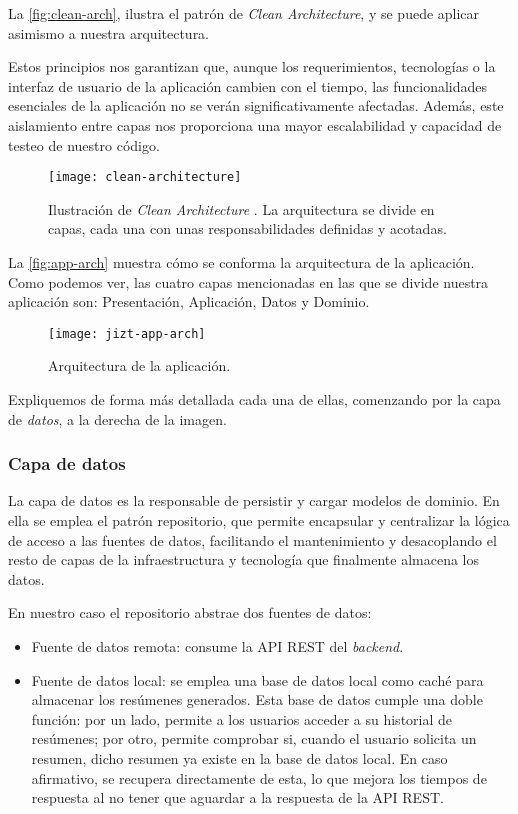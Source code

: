 La \autoref{fig:clean-arch}, ilustra el patrón de \emph{Clean Architecture}, y se puede aplicar asimismo a nuestra arquitectura.

Estos principios nos garantizan que, aunque los requerimientos, tecnologías o la interfaz de usuario de la aplicación cambien con el tiempo, las funcionalidades esenciales de la aplicación no se verán significativamente afectadas. Además, este aislamiento entre capas nos proporciona una mayor escalabilidad y capacidad de testeo de nuestro código.

\begin{figure}[!h]
	\centering
	\texttt{[image: clean-architecture]}
	\caption[Ilustración de \emph{Clean Architecture}.]{Ilustración de \emph{Clean Architecture} \cite{martin15}. La arquitectura se divide en capas, cada una con unas responsabilidades definidas y acotadas.}
	\label{fig:clean-arch}
\end{figure}


La \autoref{fig:app-arch} muestra cómo se conforma la arquitectura de la aplicación. Como podemos ver, las cuatro capas mencionadas en las que se divide nuestra aplicación son: Presentación, Aplicación, Datos y Dominio.

\begin{figure}[!h]
	\centering
	\texttt{[image: jizt-app-arch]}
	\caption{Arquitectura de la aplicación.}
	\label{fig:app-arch}
\end{figure}

Expliquemos de forma más detallada cada una de ellas, comenzando por la capa de \emph{datos}, a la derecha de la imagen.

\subsubsection{Capa de datos}

La capa de datos es la responsable de persistir y cargar modelos de dominio. En ella se emplea el patrón repositorio, que permite encapsular y centralizar la lógica de acceso a las fuentes de datos, facilitando el mantenimiento y desacoplando el resto de capas de la infraestructura y tecnología que finalmente almacena los datos.

En nuestro caso el repositorio abstrae dos fuentes de datos:

\vspace{-0.3cm}
\begin{itemize} [\textbullet]
	\item Fuente de datos remota: consume la API REST del \emph{backend}.
	
	\item Fuente de datos local: se emplea una base de datos local como caché para almacenar los resúmenes generados. Esta base de datos cumple una doble función: por un lado, permite a los usuarios acceder a su historial de resúmenes; por otro, permite comprobar si, cuando el usuario solicita un resumen, dicho resumen ya existe en la base de datos local. En caso afirmativo, se recupera directamente de esta, lo que mejora los tiempos de respuesta al no tener que aguardar a la respuesta de la API REST.
\end{itemize}

